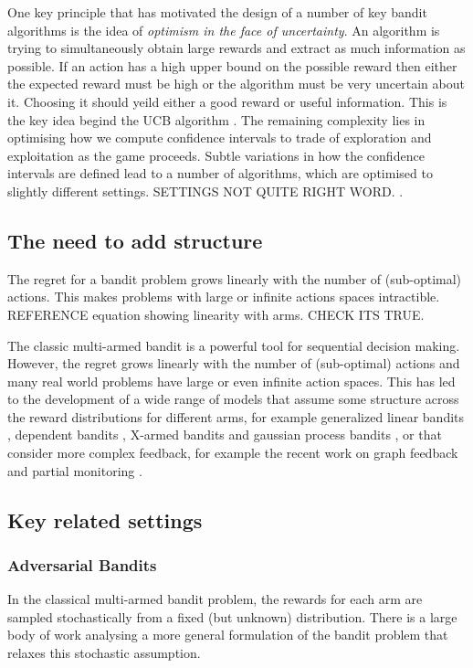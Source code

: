 \documentclass[11pt,a4paper,oneside]{book}
\begin{document}
One key principle that has motivated the design of a number  of key bandit algorithms is the idea of \emph{optimism in the face of uncertainty}. An algorithm is trying to simultaneously obtain large rewards and extract as much information as possible. If an action has a high upper bound on the possible reward then either the expected reward must be high or the algorithm must be very uncertain about it. Choosing it should yeild either a good reward or useful information. This is the key idea begind the UCB algorithm \citep{xxx}. The remaining complexity lies in optimising how we compute confidence intervals to trade of exploration and exploitation as the game proceeds. Subtle variations in how the confidence intervals are defined lead to a number of algorithms, which are optimised to slightly different settings. SETTINGS NOT QUITE RIGHT WORD. \citep{xxx}.


\subsection*{The need to add structure}
The regret for a bandit problem grows linearly with the number of (sub-optimal) actions. This makes problems with large or infinite actions spaces intractible. REFERENCE equation showing linearity with arms. CHECK ITS TRUE. 

The classic multi-armed bandit is a powerful tool for sequential decision making. However, the regret grows linearly with the number of (sub-optimal) actions and many real world problems have large or even infinite action spaces. This has led to the development of a wide range of models that assume some structure across the reward distributions for different arms, for example generalized linear bandits \cite{filippi2010parametric}, dependent bandits \cite{Pandey2007}, X-armed bandits \cite{Bubeck2010} and gaussian process bandits \cite{srinivas2009gaussian}, or that consider more complex feedback, for example the recent work on graph feedback \cite{Mannor2011,Lelarge2012,Alon2013,Buccapatnam2014,Kocak2014,Alon2015} and partial monitoring \cite{Piccolboni2001,Bartok2014}. 


\subsection*{Key related settings}

\subsubsection*{Adversarial Bandits}
In the classical multi-armed bandit problem, the rewards for each arm are sampled stochastically from a fixed (but unknown) distribution. There is a large body of work analysing a more general formulation of the bandit problem that relaxes this stochastic assumption. 
\end{document}

